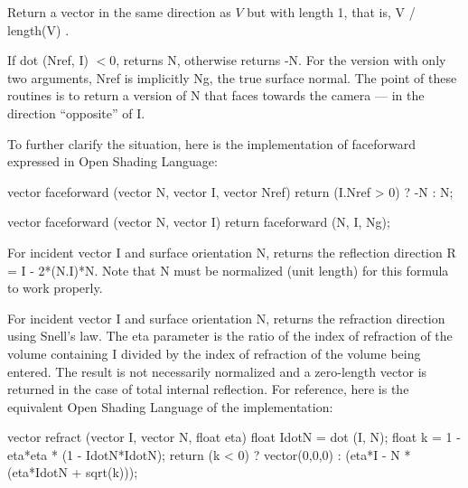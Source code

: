 \documentclass[11pt,letterpaper]{book}
\def\langname{Open Shading Language\xspace}
\begin{document}
Return a vector in the same direction as $V$ but with length 1,
that is, {\cf V / length(V)} .
\apiend

If {\cf dot (Nref, I)} $<0$, returns {\cf N}, otherwise returns {\cf -N}.
For the version with only two arguments, {\cf Nref} is implicitly {\cf
Ng}, the true surface normal.  The point of these routines is to
return a version of {\cf N} that faces towards the camera --- in the
direction ``opposite'' of {\cf I}.

To further clarify the situation, here is the implementation of
{\cf faceforward} expressed in \langname:

\begin{code}
vector faceforward (vector N, vector I, vector Nref)
{
    return (I.Nref > 0) ? -N : N;
}

vector faceforward (vector N, vector I)
{
    return faceforward (N, I, Ng);
}
\end{code}
\apiend

For incident vector {\cf I} and surface orientation {\cf N}, returns the
reflection direction {\cf R = I - 2*(N.I)*N}.  Note that {\cf N} must be
normalized (unit length) for this formula to work properly.
\apiend

For incident vector {\cf I} and surface orientation {\cf N}, 
returns the refraction direction using Snell's law. The {\cf eta} 
parameter is the ratio of the index of refraction of the volume containing
{\cf I} divided by the index of refraction of the volume being entered.
The result is not necessarily normalized and a zero-length vector is 
returned in the case of total internal reflection.  
For reference, here is the equivalent \langname of the implementation:

\begin{code}
vector refract (vector I, vector N, float eta)
{
    float IdotN = dot (I, N);
    float k = 1 - eta*eta * (1 - IdotN*IdotN);
    return (k < 0) ? vector(0,0,0) : (eta*I - N * (eta*IdotN + sqrt(k)));
}
\end{code}
\apiend
\end{document}
